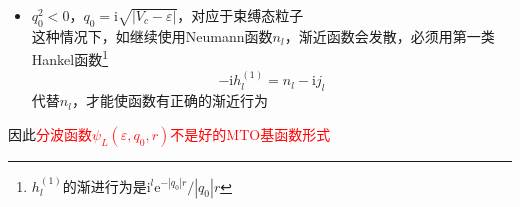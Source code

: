 {\begin{enumerate}
\begin{itemize}
						\begin{displaymath}
							\psi_l(\varepsilon,q_0,r)\sim-\dfrac{\sin(q_0r+\eta_l-l\pi/2)}{r\sin(\eta_l)}
						\end{displaymath}
						表明$r\rightarrow\infty$，波函数是经\textrm{MT}球散射的球函数分波，散射相移为$\eta_l$
					\item $q_0^2<0$，$q_0=\mathrm{i}\sqrt{|V_c-\varepsilon|}$，对应于束缚态粒子\\
						这种情况下，如继续使用\textrm{Neumann}函数$n_l$，渐近函数会发散，必须用第一类\textrm{Hankel}函数\footnote{\tiny $h_l^{(1)}$的渐进行为是$\mathrm{i}^l\mathrm{e}^{-|q_0|r}/|q_0|r$}
						\begin{displaymath}
							-\mathrm{i}h_l^{(1)}=n_l-\mathrm{i}j_l
						\end{displaymath}
代替$n_l$，才能使函数有正确的渐近行为
				\end{itemize}

				因此\textcolor{red}{分波函数$\psi_L(\varepsilon,q_0,r)$不是好的\textrm{MTO}基函数形式}
		\end{enumerate}
}

